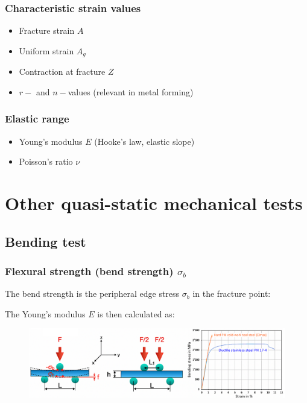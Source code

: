 \documentclass{article}
\begin{document}
\subsubsection{Characteristic strain values}
\begin{itemize}
  \item Fracture strain $A$
  \item Uniform strain $A_g$
  \item Contraction at fracture $Z$
  \item $r-$ and $n-$values (relevant in metal forming) 
\end{itemize}

\subsubsection{Elastic range}
\begin{itemize}
  \item Young's modulus $E$ (Hooke's law, elastic slope)
  \item Poisson's ratio $\nu$
\end{itemize}

\newpage
\section{Other quasi-static mechanical tests}
\subsection{Bending test}
\subsubsection{Flexural strength (bend strength) $\sigma_b$}
The bend strength is the peripheral edge stress $\sigma_b$ in the
fracture point:

The Young's modulus $E$ is then calculated as:

\begin{figure}[ht!]
  \centering
  \includegraphics[width=\textwidth]{media/bending-test.png}
\end{figure}
\end{document}
